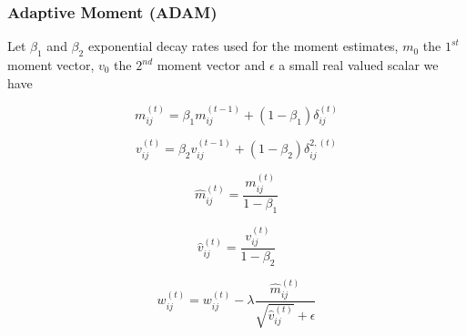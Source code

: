 \subsubsection*{Adaptive Moment (ADAM)}
Let $\beta_1$ and $\beta_2$ exponential decay rates used for the moment estimates, $m_0$ the $1^{st}$ moment vector, $v_0$ the $2^{nd}$ moment vector and $\epsilon$ a small real valued scalar we have 
\begin{center}
	\begin{equation}
		m_{ij}^{(t)} = \beta_1m_{ij}^{(t-1)} + (1 - \beta_1)\delta_{ij}^{(t)}
	\end{equation}
\end{center}

\begin{center}
	\begin{equation}
		v_{ij}^{(t)} = \beta_2v_{ij}^{(t-1)} + (1 - \beta_2)\delta_{ij}^{2,  (t)}
	\end{equation}
\end{center}

\begin{center}
	\begin{equation}
		\hat{m}_{ij}^{(t)} = \frac{m_{ij}^{(t)}}{1 - \beta_{1}}
	\end{equation}
\end{center}

\begin{center}
	\begin{equation}
		\hat{v}_{ij}^{(t)} = \frac{v_{ij}^{(t)}}{1 - \beta_{2}}
	\end{equation}
\end{center}

\begin{center}
	\begin{equation}
		w_{ij}^{(t)} = w_{ij}^{(t)} - \lambda\frac{\hat{m}_{ij}^{(t)}}{\sqrt{\hat{v}_{ij}^{(t)}} + \epsilon}
	\end{equation}
\end{center}

